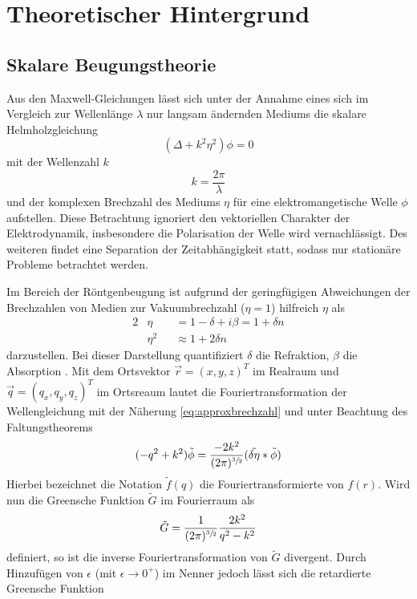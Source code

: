 \chapter{Theoretischer Hintergrund}
\label{c_theorie}
 
\section{Skalare Beugungstheorie}

Aus den Maxwell-Gleichungen lässt sich unter der Annahme eines sich im Vergleich zur Wellenlänge $\lambda$ nur langsam ändernden Mediums die skalare Helmholzgleichung
\begin{equation}
(\Delta+k^2\eta^2)\phi=0
\end{equation}
mit der Wellenzahl $k$
\begin{equation}
	k=\frac{2\pi}{\lambda}
\end{equation} und der komplexen Brechzahl des Mediums $\eta$ für eine elektromangetische Welle $\phi$ aufstellen. Diese Betrachtung ignoriert den vektoriellen Charakter der Elektrodynamik, insbesondere die Polarisation der Welle wird vernachlässigt. Des weiteren findet eine Separation der Zeitabhängigkeit statt, sodass nur stationäre Probleme betrachtet werden.

Im Bereich der Röntgenbeugung ist aufgrund der geringfügigen Abweichungen der Brechzahlen von Medien zur Vakuumbrechzahl ($\eta=1$) hilfreich $\eta$ als
\begin{alignat}{2}
\label{eq:brechzahl}
	&\eta&&=1-\delta+i\beta=1 + \delta n \\
\label{eq:approxbrechzahl}
	&\eta^2&&\approx 1 + 2\delta n
\end{alignat}
darzustellen. Bei dieser Darstellung quantifiziert $\delta$ die Refraktion, $\beta$ die Absorption \cite[S. 21]{attwood1999}.
Mit dem Ortsvektor $\vec{r}=(x,y,z)^T$ im Realraum und $\vec{q}=(q_x,q_y,q_z)^T$ im Ortsreaum lautet die Fouriertransformation der Wellengleichung mit der Näherung \ref{eq:approxbrechzahl} und unter Beachtung des Faltungstheorems
\begin{equation}
	(-q^2+k^2)\tilde{\phi}=\frac{-2k^2}{(2\pi)^{\sfrac{3}{2}}}(\tilde{\delta \eta} \ast \tilde{\phi})
\end{equation}
Hierbei bezeichnet die Notation $\tilde{f}(q)$ die Fouriertransformierte von $f(r)$. Wird nun die Greensche Funktion  $\tilde{G}$ im Fourierraum als
\begin{equation}
	\tilde{G}=\frac{1}{(2\pi)^{\sfrac{3}{2}}}\frac{2k^2}{q^2-k^2}
\end{equation}
definiert, so ist die inverse Fouriertransformation von $\tilde{G}$ divergent. Durch Hinzufügen von $\epsilon$ (mit $\epsilon\rightarrow 0^+$) im Nenner jedoch lässt sich die retardierte Greensche Funktion 


